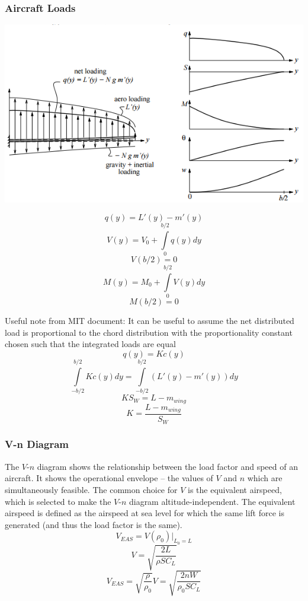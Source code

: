 \documentclass[11pt]{article}
\newcommand{\intlim}[2]{\int\limits_{#1}^{#2}}
\begin{document}
\subsubsection{Aircraft Loads}
\begin{minipage}{0.63\textwidth}
\includegraphics[width=\textwidth]{Graphics/aircraft_loads.png}
\end{minipage}
\begin{minipage}{0.35\textwidth}
$$q(y)=L'(y)-m'(y)$$
$$V(y) = V_0 + \intlim{0}{b/2}q(y)dy$$
$$V(b/2) = 0$$
$$M(y) = M_0 + \intlim{0}{b/2}V(y)dy$$
$$M(b/2) = 0 $$
\end{minipage}

Useful note from MIT document: It can be useful to assume the net distributed load is proportional to the chord distribution with the proportionality constant chosen such that the integrated loads are equal
$$q(y)=Kc(y)$$
$$\intlim{-b/2}{b/2}Kc(y)dy = \intlim{-b/2}{b/2}(L'(y)-m'(y))dy$$
$$KS_W = L-m_{wing}$$
$$K = \frac{L-m_{wing}}{S_W}$$
\subsubsection{V-n Diagram}
The $V$-$n$ diagram shows the relationship between the load factor and speed of an aircraft. It shows the operational envelope -- the values of $V$ and $n$ which are simultaneously feasible. The common choice for $V$ is the equivalent airspeed, which is selected to make the $V$-$n$ diagram altitude-independent. The equivalent airspeed is defined as the airspeed at sea level for which the same lift force is generated (and thus the load factor is the same).
$$V_{EAS} = V(\rho_0)\big|_{L_0=L}$$
$$V = \sqrt{\frac{2L}{\rho SC_L}}$$
$$V_{EAS} = \sqrt{\frac{\rho}{\rho_0}}V = \sqrt{\frac{2nW}{\rho_0SC_L}}$$
\end{document}
